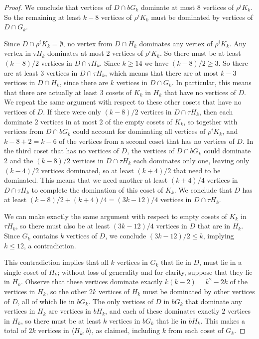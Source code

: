 \documentclass{amsart}
\theoremstyle{remark}
\theoremstyle{definition}
\begin{document}
\begin{proof}
We conclude that vertices of $D \cap bG_k$ dominate at most $8$ vertices of $\rho^iK_k$. So the remaining at least $k-8$ vertices of $\rho^iK_k$ must be dominated by vertices of $D \cap G_k$. 

Since $D \cap \rho^iK_k=\emptyset$, no vertex from $D \cap H_k$ dominates any vertex of $\rho^iK_k$. Any vertex in $\tau H_k$ dominates at most $2$ vertices of $\rho^iK_k$. So there must be at least $(k-8)/2$ vertices in $D \cap \tau H_k$.
 Since $k \ge 14$ we have $(k-8)/2\ge 3$. So there are at least $3$ vertices in $D\cap \tau H_k$, which  means that there are at most $k-3$ vertices in $D\cap H_k$, since there are $k$ vertices in $D\cap G_k$. In particular, this means that there are actually at least $3$ cosets of $K_k$ in $H_k$ that have no vertices of $D$. We repeat the same argument with respect to these other cosets that have no vertices of $D$. If there were only $(k-8)/2$ vertices in $D\cap \tau H_k$, then each dominate $2$ vertices in at most 2 of the empty cosets of $K_k$, so together with vertices from $D \cap bG_k$ could account for dominating all vertices of $\rho^iK_k$, and $k-8+2=k-6$ of the vertices from a second coset that has no vertices of $D$. In the third coset that has no vertices of $D$, the vertices of $D\cap bG_k$ could dominate $2$ and the $(k-8)/2$ vertices in $D\cap \tau H_k$ each dominates only one, leaving only $(k-4)/2$ vertices dominated, so at least $(k+4)/2$ that need to be dominated. This means that we need another at least $(k+4)/4$ vertices in $D\cap \tau H_k$ to complete the domination of this coset of $K_k$. We conclude that $D$ has at least $(k-8)/2+(k+4)/4=(3k-12)/4$ vertices in $D \cap \tau H_k$. 

    We can make exactly the same argument with respect to empty cosets of $K_k$ in  $\tau H_k$, so there must also be at least $(3k-12)/4$ vertices in $D$ that are in $H_k$. Since $G_k$ contains $k$ vertices of $D$, we conclude $(3k-12)/2 \le k$, implying $k \le 12$, a contradiction.

    This contradiction implies that all $k$ vertices in $G_k$ that lie in $D$, must lie in a single coset of $H_k$; without loss of generality and for clarity, suppose that they lie in $H_k$. Observe that these vertices dominate exactly $k(k-2)=k^2-2k$ of the vertices in $H_k$, so the other $2k$ vertices of $H_k$ must be dominated by other vertices of $D$, all of which lie in $bG_k$. The only vertices of $D$ in  $bG_k$ that dominate any vertices in $H_k$ are vertices in $bH_k$, and each of these dominates exactly $2$ vertices in $H_k$, so there must be at least $k$ vertices in $bG_k$ that lie in $b H_k$. This makes a total of $2k$ vertices in $\langle H_k, b\rangle$, as claimed, including $k$ from each coset of $G_k$.
\end{proof}
\end{document}
